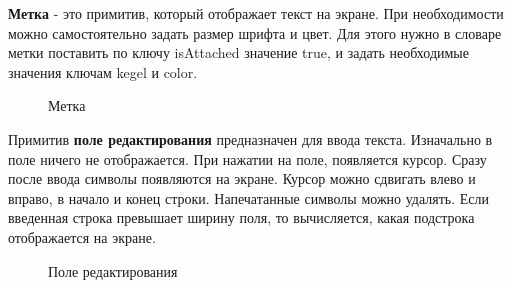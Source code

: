 \documentclass[14pt]{extarticle}
\begin{document}
		\textbf{Метка} - это примитив, который отображает текст на экране. При необходимости можно самостоятельно задать размер шрифта и цвет. Для этого нужно в словаре метки поставить по ключу isAttached значение true, и задать необходимые значения ключам kegel и color. 
		\begin{figure}[h]
		\caption{ Метка }
		\label{ris:image}
		\end{figure}	

		Примитив \textbf{поле редактирования} предназначен для ввода текста. Изначально в поле ничего не отображается. При нажатии на поле, появляется курсор. Сразу после ввода символы появляются на экране. Курсор можно сдвигать влево и вправо, в начало и конец строки. Напечатанные символы можно удалять. Если введенная строка превышает ширину поля, то вычисляется, какая подстрока отображается на экране. 
		\begin{figure}[h]
		\caption{ Поле редактирования }
		\label{ris:image}
		\end{figure}	
		
\end{document}
